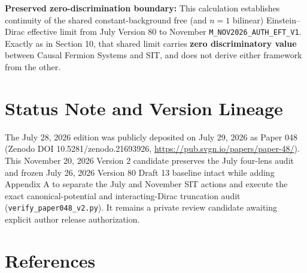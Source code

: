 \documentclass[
  american,
  11pt,
  letterpaper,
]{article}
\begin{document}
\textbf{Preserved zero-discrimination boundary:} This calculation establishes continuity of the shared constant-background free (and \(n=1\) bilinear) Einstein--Dirac effective limit from July Version 80 to November \nolinkurl{M_NOV2026_AUTH_EFT_V1}. Exactly as in Section 10, that shared limit carries \textbf{zero discriminatory value} between Causal Fermion Systems and SIT, and does not derive either framework from the other.

\section{Status Note and Version Lineage}\label{status-note-and-version-lineage}

The July 28, 2026 edition was publicly deposited on July 29, 2026 as Paper 048 (Zenodo DOI 10.5281/zenodo.21693926, \url{https://pub.svgn.io/papers/paper-48/}). This November 20, 2026 Version 2 candidate preserves the July four-lens audit and frozen July 26, 2026 Version 80 Draft 13 baseline intact while adding Appendix A to separate the July and November SIT actions and execute the exact canonical-potential and interacting-Dirac truncation audit (\nolinkurl{verify_paper048_v2.py}). It remains a private review candidate awaiting explicit author release authorization.

\section{References}\label{references}
\end{document}
